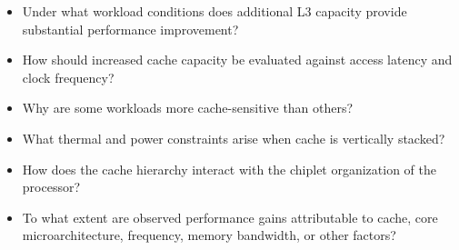 \begin{itemize}
  \item Under what workload conditions does additional L3 capacity provide substantial performance improvement?
  \item How should increased cache capacity be evaluated against access latency and clock frequency?
  \item Why are some workloads more cache-sensitive than others?
  \item What thermal and power constraints arise when cache is vertically stacked?
  \item How does the cache hierarchy interact with the chiplet organization of the processor?
  \item To what extent are observed performance gains attributable to cache, core microarchitecture, frequency, memory bandwidth, or other factors?
\end{itemize}
